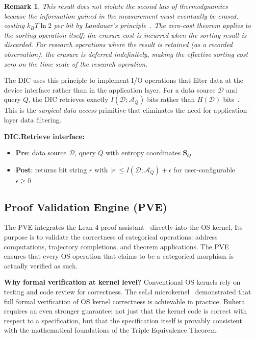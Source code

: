 \documentclass[12pt,twocolumn]{article}
\newtheorem{remark}{Remark}[section]
\begin{document}
\begin{remark}
This result does not violate the second law of thermodynamics~\cite{bennett1973logical} because the information gained in the measurement must eventually be erased, costing $k_B T \ln 2$ per bit by Landauer's principle~\cite{landauer1961irreversibility}. The zero-cost theorem applies to the sorting operation itself; the erasure cost is incurred when the sorting result is discarded. For research operations where the result is retained (as a recorded observation), the erasure is deferred indefinitely, making the effective sorting cost zero on the time scale of the research operation.
\end{remark}

The DIC uses this principle to implement I/O operations that filter data at the device interface rather than in the application layer. For a data source $\mathcal{D}$ and query $Q$, the DIC retrieves exactly $I(\mathcal{D}; \mathcal{A}_Q)$ bits rather than $H(\mathcal{D})$ bits~\cite{shannon1949mathematical,cover2006elements}. This is the \emph{surgical data access} primitive that eliminates the need for application-layer data filtering.

\textbf{DIC.Retrieve interface:}
\begin{itemize}
\item \textbf{Pre}: data source $\mathcal{D}$, query $Q$ with entropy coordinates $\mathbf{S}_Q$
\item \textbf{Post}: returns bit string $r$ with $|r| \leq I(\mathcal{D}; \mathcal{A}_Q) + \epsilon$ for user-configurable $\epsilon \geq 0$
\end{itemize}

\subsection{Proof Validation Engine (PVE)}

The PVE integrates the Lean 4 proof assistant~\cite{moura2021lean4} directly into the OS kernel. Its purpose is to validate the correctness of categorical operations: address computations, trajectory completions, and theorem applications. The PVE ensures that every OS operation that claims to be a categorical morphism is actually verified as such.

\textbf{Why formal verification at kernel level?} Conventional OS kernels rely on testing and code review for correctness. The seL4 microkernel~\cite{klein2009sel4} demonstrated that full formal verification of OS kernel correctness is achievable in practice. Buhera requires an even stronger guarantee: not just that the kernel code is correct with respect to a specification, but that the specification itself is provably consistent with the mathematical foundations of the Triple Equivalence Theorem.
\end{document}
